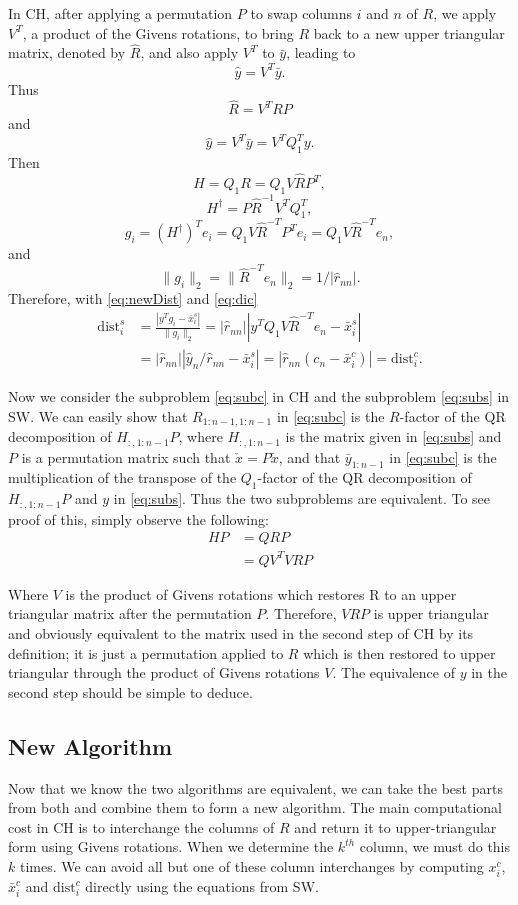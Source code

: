 \documentclass[12pt,Bold,letterpaper]{mcgilletdclass}
\newcommand{\dist}{\mathrm{dist}}
\newcommand{\vsp}{\vspace{\baselineskip}}
\begin{document}
In CH, after applying a permutation $P$ to swap columns $i$ and $n$ of $R$,  
we apply $V^T$, a product of the Givens rotations, to bring $R$ back to a new upper triangular
matrix, denoted by $\hat{R}$, and also apply $V^T$ to $\bar{y}$, 
leading to  $$\hat{y} = V^T\bar{y}.$$
Thus  $$\hat{R}=V^T RP$$ and $$\hat{y} = V^T\bar{y}=V^TQ_1^Ty.$$
Then $$H=Q_1R= Q_1V\hat{R}P^T,$$ $$H^\dag= P\hat{R}^{-1}V^TQ_1^T,$$ 
$$g_i=(H^\dag)^Te_i=Q_1V\hat{R}^{-T}P^Te_i=Q_1V\hat{R}^{-T}e_n,$$
and $$\|g_i\|_2=\|\hat{R}^{-T}e_n\|_2=1/|\hat{r}_{nn}|.$$
Therefore, with \eqref{eq:newDist} and \eqref{eq:dic}
\begin{align}
\dist_i^s
&=\frac{ | y^Tg_i - \bar{x}_i^s   |}{  \| g_i   \|_2} 
=|\hat{r}_{nn}||y^TQ_1V\hat{R}^{-T}e_n- \bar{x}_i^s  |  \label{eq:disc} \\
& = |\hat{r}_{nn}|| \hat{y}_n/\hat{r}_{nn} - \bar{x}_i^s | 
 = |\hat{r}_{nn}(c_n-\bar{x}_i^c)| =\dist_i^c.  \nonumber
\end{align}

Now we consider  the subproblem \eqref{eq:subc} in CH and the subproblem \eqref{eq:subs} in SW.
We can easily show that $R_{1:n-1,1:n-1}$ in  \eqref{eq:subc} is the $R$-factor of the QR decomposition
of $H_{:,1:n-1}P$, where $H_{:,1:n-1}$ is the matrix given in \eqref{eq:subs}
and $P$ is a permutation matrix such that $\check{x}=P\tilde{x}$,
and that $\bar{y}_{1:n-1}$ in  \eqref{eq:subc} is the multiplication of the transpose of 
the $Q_1$-factor of the QR decomposition of $H_{:,1:n-1}P$ and $y$ in \eqref{eq:subs}.
Thus the two subproblems are equivalent. To see proof of this, simply observe the following:
\begin{align}
HP &= QRP \\
&=QV^TVRP
\end{align}

Where $V$ is the product of Givens rotations which restores R to an upper triangular matrix after the permutation $P$. Therefore, $VRP$ is upper triangular and obviously equivalent to the matrix used in the second step of CH by its definition; it is just a permutation applied to $R$ which is then restored to upper triangular through the product of Givens rotations $V$. The equivalence of $y$ in the second step should be simple to deduce.

\vsp \subsection{New Algorithm} \label{subsec:newReduction}
Now that we know the two algorithms are equivalent, we can take the best
parts from both and combine them to form a new algorithm. 
The main computational cost in CH is to interchange the columns of $R$ and return it to
upper-triangular form using Givens rotations. 
When we determine the $k^{th}$ column,  we must do this $k$ times. 
We can avoid all but one of these column interchanges by computing $x_i^c$, 
$\bar{x}_i^c$ and $\dist_i^c$ directly using the equations from SW. 
\end{document}
